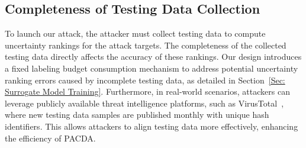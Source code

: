 \documentclass[conference,compsoc]{IEEEtran} %
\begin{document}
\subsection{Completeness of Testing Data Collection}
To launch our attack, the attacker must collect testing data to compute uncertainty rankings for the attack targets.
The completeness of the collected testing data directly affects the accuracy of these rankings.
Our design introduces a fixed labeling budget consumption mechanism to address potential uncertainty ranking errors caused by incomplete testing data, as detailed in Section~\ref{Sec: Surrogate Model Training}.
Furthermore, in real-world scenarios, attackers can leverage publicly available threat intelligence platforms, such as VirusTotal~\cite{Virustotaluploadinterface}, where new testing data samples are published monthly with unique hash identifiers.
This allows attackers to align testing data more effectively, enhancing the efficiency of PACDA.
\end{document}
